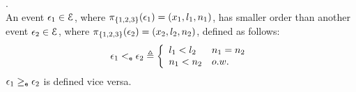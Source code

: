%
\begin{defn}.
\label{def:query_dir}
\\
An event $\mathtt{\epsilon}_1 \in \mathcal{E}$, where $\pi_{\{1, 2, 3\}}(\mathtt{\epsilon}_1) = (x_1, l_1, n_1)$,
has smaller order than another event $\mathtt{\epsilon}_2 \in \mathcal{E}$, 
where 
$ \pi_{\{1, 2, 3\}}(\mathtt{\epsilon}_2) = (x_2, l_2, n_2)$, defined as follows:
%
\[
\event_1 \eventlt \event_2
\triangleq 
\left\{
\begin{array}{ll}
  l_1 < l_2 & n_1 = n_2
  \\
  n_1 < n_2  & o.w.
\end{array}  
\right.
\]
%
$\mathtt{\epsilon}_1 \geq_{\mathtt{e}} \mathtt{\epsilon}_2$  is defined vice versa.
\end{defn}
%
%